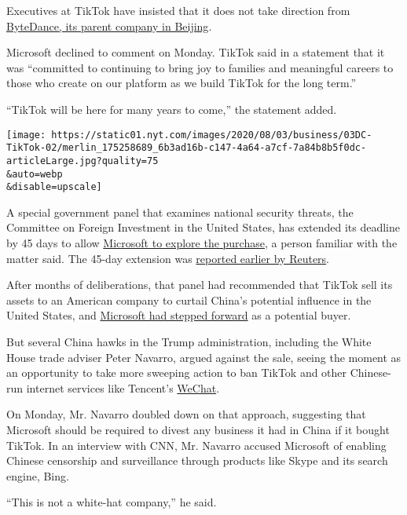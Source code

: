 Executives at TikTok have insisted that it does not take direction from
\href{https://www.nytimes.com/2020/08/03/technology/tiktok-bytedance-us-china.html}{ByteDance,
its parent company in Beijing}.

Microsoft declined to comment on Monday. TikTok said in a statement that
it was ``committed to continuing to bring joy to families and meaningful
careers to those who create on our platform as we build TikTok for the
long term.''

``TikTok will be here for many years to come,'' the statement added.

\texttt{[image: https://static01.nyt.com/images/2020/08/03/business/03DC-TikTok-02/merlin\_175258689\_6b3ad16b-c147-4a64-a7cf-7a84b8b5f0dc-articleLarge.jpg?quality=75\\\&auto=webp\\\&disable=upscale]}

A special government panel that examines national security threats, the
Committee on Foreign Investment in the United States, has extended its
deadline by 45 days to allow
\href{https://www.nytimes.com/2020/08/03/technology/tiktok-microsoft-tweens.html}{Microsoft
to explore the purchase}, a person familiar with the matter said. The
45-day extension was
\href{https://www.reuters.com/article/us-usa-tiktok-trump-exclusive/exclusive-trump-gives-microsoft-45-days-to-clinch-tiktok-deal-idUSKBN24Y0UD}{reported
earlier by Reuters}.

After months of deliberations, that panel had recommended that TikTok
sell its assets to an American company to curtail China's potential
influence in the United States, and
\href{https://www.nytimes.com/2020/07/31/technology/tiktok-microsoft.html}{Microsoft
had stepped forward} as a potential buyer.

But several China hawks in the Trump administration, including the White
House trade adviser Peter Navarro, argued against the sale, seeing the
moment as an opportunity to take more sweeping action to ban TikTok and
other Chinese-run internet services like Tencent's
\href{https://www.nytimes.com/2020/08/07/business/trump-china-wechat-tiktok.html}{WeChat}.

On Monday, Mr. Navarro doubled down on that approach, suggesting that
Microsoft should be required to divest any business it had in China if
it bought TikTok. In an interview with CNN, Mr. Navarro accused
Microsoft of enabling Chinese censorship and surveillance through
products like Skype and its search engine, Bing.

``This is not a white-hat company,'' he said.

